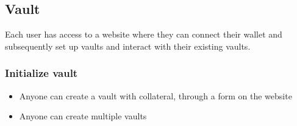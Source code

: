 \documentclass{article} %
\begin{document}
% 
% 
% 
% 
\subsection{Vault}

Each user has access to a website where they can connect their wallet and
subsequently set up vaults and interact with their existing vaults.

\subsubsection*{Initialize vault}

\begin{itemize}
  \item Anyone can create a vault with collateral, through a form on the website
  \item Anyone can create multiple vaults
\end{itemize}
\end{document}
